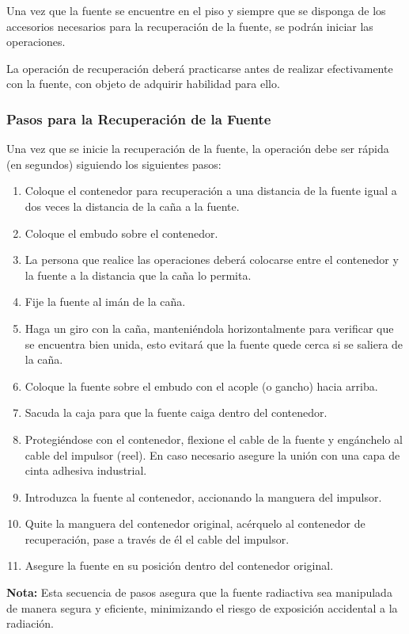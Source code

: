 
Una vez que la fuente se encuentre en el piso y siempre que se disponga de los accesorios necesarios para la recuperación de la fuente, se podrán iniciar las operaciones.

La operación de recuperación deberá practicarse antes de realizar efectivamente con la fuente, con objeto de adquirir habilidad para ello.

\subsubsection*{Pasos para la Recuperación de la Fuente}
Una vez que se inicie la recuperación de la fuente, la operación debe ser rápida (en segundos) siguiendo los siguientes pasos:
\begin{enumerate}
    \item Coloque el contenedor para recuperación a una distancia de la fuente igual a dos veces la distancia de la caña a la fuente.
    \item Coloque el embudo sobre el contenedor.
    \item La persona que realice las operaciones deberá colocarse entre el contenedor y la fuente a la distancia que la caña lo permita.
    \item Fije la fuente al imán de la caña.
    \item Haga un giro con la caña, manteniéndola horizontalmente para verificar que se encuentra bien unida, esto evitará que la fuente quede cerca si se saliera de la caña.
    \item Coloque la fuente sobre el embudo con el acople (o gancho) hacia arriba.
    \item Sacuda la caja para que la fuente caiga dentro del contenedor.
    \item Protegiéndose con el contenedor, flexione el cable de la fuente y engánchelo al cable del impulsor (reel). En caso necesario asegure la unión con una capa de cinta adhesiva industrial.
    \item Introduzca la fuente al contenedor, accionando la manguera del impulsor.
    \item Quite la manguera del contenedor original, acérquelo al contenedor de recuperación, pase a través de él el cable del impulsor.
    \item Asegure la fuente en su posición dentro del contenedor original.
\end{enumerate}

\textbf{Nota:} Esta secuencia de pasos asegura que la fuente radiactiva sea manipulada de manera segura y eficiente, minimizando el riesgo de exposición accidental a la radiación.
